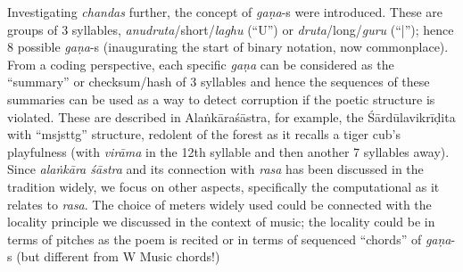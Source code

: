 Investigating \textsl{chandas} further, the concept of \textsl{gaṇa}-s were introduced. These are groups of 3 syllables, \textsl{anudruta}/short/\textsl{laghu} (“U”) or \textsl{druta}/long/\textsl{guru} (“|”); hence 8 possible \textsl{gaṇa}-s (inaugurating the start of binary notation, now commonplace). From a coding perspective, each specific \textsl{gaṇa} can be considered as the “summary” or checksum/hash of 3 syllables and hence the sequences of these summaries can be used as a way to detect corruption if the poetic structure is violated. These are described in Alaṅkāraśāstra, for example, the Śārdūlavikrīḍita with “msjsttg” structure, redolent of the forest as it recalls a tiger cub’s playfulness (with \textsl{virāma} in the 12th syllable and then another 7 syllables away). Since \textsl{alaṅkāra śāstra} and its connection with \textsl{rasa} has been discussed in the tradition widely, we focus on other aspects, specifically the computational as it relates to \textsl{rasa}. The choice of meters widely used could be connected with the locality principle we discussed in the context of music; the locality could be in terms of pitches as the poem is recited or in terms of sequenced “chords” of \textsl{gaṇa}-s (but different from W Music chords!)


